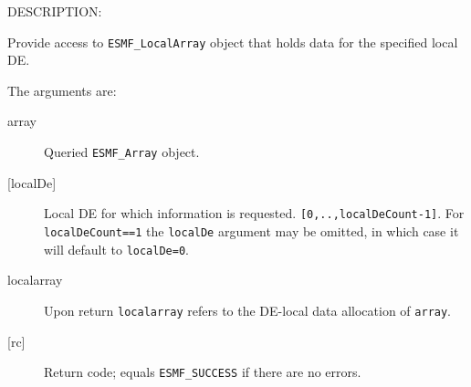 {\sf DESCRIPTION:\\ }


   Provide access to {\tt ESMF\_LocalArray} object that holds data for
   the specified local DE.
  
   The arguments are:
   \begin{description}
   \item[array]
   Queried {\tt ESMF\_Array} object.
   \item[{[localDe]}]
   Local DE for which information is requested. {\tt [0,..,localDeCount-1]}.
   For {\tt localDeCount==1} the {\tt localDe} argument may be omitted,
   in which case it will default to {\tt localDe=0}.
   \item[localarray]
   Upon return {\tt localarray} refers to the DE-local data allocation of
   {\tt array}.
   \item[{[rc]}]
   Return code; equals {\tt ESMF\_SUCCESS} if there are no errors.
   \end{description}
  
\setlength{\parskip}{\oldparskip}
\setlength{\parindent}{\oldparindent}
\setlength{\baselineskip}{\oldbaselineskip}
